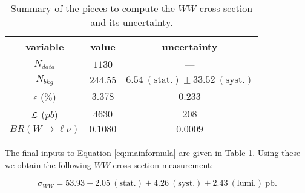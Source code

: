 \begin{table}[!ht]
\begin{center}
\begin{tabular}{|c|c|c|}
\hline
 variable      &  value & uncertainty \\
\hline
$N_{data}$     & $1130$ & ---\\
\hline
$N_{bkg}$      & $244.55$ & $6.54~\mathrm{(stat.)} \pm 33.52~\mathrm{(syst.)}$ \\
\hline
$\epsilon$ (\%) & $3.378$ & $0.233$  \\
\hline
$\cal{L}$ ($pb$) & $4630$ & $208$ \\
\hline
$BR(W \to \ell \nu)$ & $0.1080$ & $0.0009$ \\
\hline
\end{tabular}
\caption{Summary of the pieces to compute the $WW$ cross-section and its uncertainty.}
  \label{tab:xs_summary}
\end{center}
\end{table}

The final inputs to Equation \ref{eq:mainformula} are given in
Table \ref{tab:xs_summary}.  Using these we obtain the following 
$WW$ cross-section measurement:

\begin{equation*}
\sigma_{WW}  = 53.93 \pm 2.05~\mathrm{(stat.)} \pm 4.26~\mathrm{(syst.)} \pm 2.43~\mathrm{(lumi.)~pb}.
\end{equation*}

